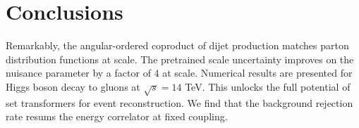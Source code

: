 \section{Conclusions}\label{sec:conclusions}

Remarkably, the angular-ordered coproduct of dijet production matches
parton distribution functions at scale. The pretrained scale uncertainty
improves on the nuisance parameter by a factor of 4 at scale. Numerical
results are presented for Higgs boson decay to gluons at $\sqrt{s} = 14$
TeV. This unlocks the full potential of set transformers for event
reconstruction. We find that the background rejection rate resums the
energy correlator at fixed coupling.

